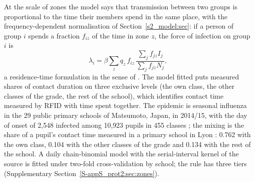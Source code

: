 At the scale of zones the model says that transmission between two groups is proportional to the time their
members spend in the same place, with the frequency-dependent normalisation of Section~\ref{s2_model:sec}: if a
person of group $i$ spends a fraction $f_{iz}$ of the time in zone $z$, the force of infection on group $i$ is
\begin{equation}\label{s8b_evidence:eq:zone}
  \lambda_i=\beta\sum_z q_z\,f_{iz}\,\frac{\sum_jf_{jz}I_j}{\sum_jf_{jz}N_j},
\end{equation}
a residence-time formulation in the sense of \citet{bichara2015sis}. The model fitted puts measured shares of
contact duration on three exclusive levels (the own class, the other classes of the grade, the rest of the
school), which identifies contact time measured by RFID with time spent together. The epidemic is seasonal
influenza in the 29 public primary schools of Matsumoto, Japan, in 2014/15, with the day of onset of 2{,}548
infected among 10{,}923 pupils in 455 classes \citep{endo2021within}; the mixing is the share of a pupil's contact
time measured in a primary school in Lyon \citep{stehle2011high,gemmetto2014mitigation}: 0.762 with the own
class, 0.104 with the other classes of the grade and 0.134 with the rest of the school. A daily chain-binomial
model with the serial-interval kernel of the source is fitted under two-fold cross-validation by school; the rule
has three tiers (Supplementary Section~\ref{S-appS_prot2:sec:zones}).

